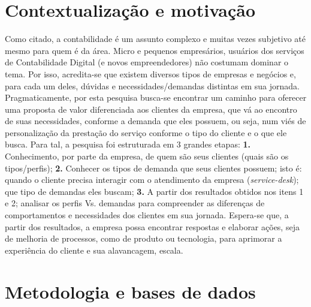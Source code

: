 \documentclass[twocolumn]{rbef}
\newcommand{\1}{\mathbbm{1}}
\begin{document}
\section{Contextualização e motivação} \label{Sessao2}

Como citado, a contabilidade é um assunto complexo e muitas vezes subjetivo até mesmo para quem é da área. Micro e pequenos empresários, usuários dos serviços de Contabilidade Digital (e novos empreendedores) não costumam dominar o tema. Por isso, acredita-se que existem diversos tipos de empresas e negócios e, para cada um deles, dúvidas e necessidades/demandas distintas em sua jornada.
\newline Pragmaticamente, por esta pesquisa busca-se encontrar um caminho para oferecer uma proposta de valor diferenciada aos clientes da empresa, que vá ao encontro de suas necessidades, conforme a demanda que eles possuem, ou seja, num viés de personalização da prestação do serviço conforme o tipo do cliente e o que ele busca. 
Para tal, a pesquisa foi estruturada em 3 grandes etapas: 
\newline\textbf{1.} Conhecimento, por parte da empresa, de quem são seus clientes (quais são os tipos/perfis);  
\newline\textbf{2.} Conhecer os tipos de demanda que seus clientes possuem; isto é: quando o cliente precisa interagir com o atendimento da empresa (\emph{service-desk}); que tipo de demandas eles buscam; 
\newline\textbf{3.} A partir dos resultados obtidos nos itens 1 e 2; analisar os perfis Vs. demandas para compreender as diferenças de comportamentos e necessidades dos clientes em sua jornada. 
Espera-se que, a partir dos resultados, a empresa possa encontrar respostas e elaborar ações, seja de melhoria de processos, como de produto ou tecnologia, para aprimorar a experiência do cliente e sua alavancagem, escala.


\section{Metodologia e bases de dados} \label{Sessao3}
\end{document}
